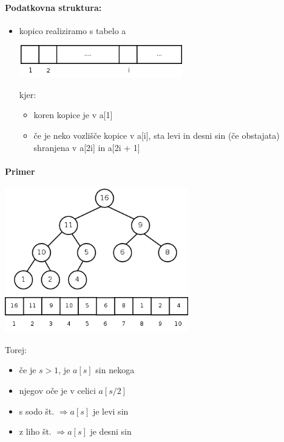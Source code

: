 \documentclass[a4paper,10pt]{article}
\begin{document}
\paragraph{Podatkovna struktura:}

\begin{itemize}
\item kopico realiziramo s tabelo a 
	\begin{center}
	\includegraphics[width=7.15cm,height=1.4cm]{Slike/RealizacijaKopiceSTabelo.png}
	\end{center}
	kjer:
	\begin{itemize}
	\item koren kopice je v a[1]
	\item \v ce je neko vozli\v s\v ce kopice v a[i], sta levi in desni sin (\v ce obstajata) shranjena v a[2i] in a[2i + 1]
	\end{itemize}
\end{itemize}

\paragraph{Primer}

	\begin{center}
	\includegraphics[width=8cm,height=6.25cm]{Slike/PrimerKopice.png}
	\end{center}
Torej:
\begin{itemize}
\item \v ce je $s > 1$, je $a[s]$ sin nekoga
\item njegov o\v ce je v celici $a[s/2]$
\item s sodo \v st. $\Rightarrow a[s]$ je levi sin
\item z liho \v st. $\Rightarrow a[s]$ je desni sin
\end{itemize}
\end{document}
